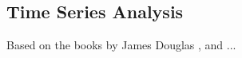 \subsection{Time Series Analysis}

Based on the books by James Douglas \cite{hamilton_1994}, and ...



